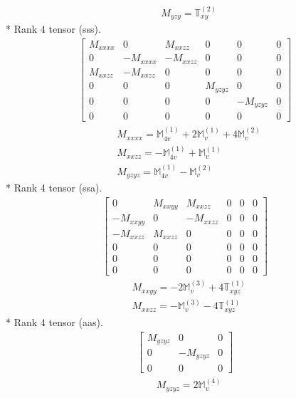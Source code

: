 \documentclass[fleqn,8pt,landscape]{jsarticle}
\begin{document}
\begin{align*}
& M_{yzy} = \mathbb{T}_{xy}^{(2)}
\end{align*}
* Rank 4 tensor (sss).
\begin{align*}
\begin{bmatrix} M_{xxxx} & 0 & M_{xxzz} & 0 & 0 & 0 \\ 0 & - M_{xxxx} & - M_{xxzz} & 0 & 0 & 0 \\ M_{xxzz} & - M_{xxzz} & 0 & 0 & 0 & 0 \\ 0 & 0 & 0 & M_{yzyz} & 0 & 0 \\ 0 & 0 & 0 & 0 & - M_{yzyz} & 0 \\ 0 & 0 & 0 & 0 & 0 & 0 \end{bmatrix}
\end{align*}
\begin{align*}
& M_{xxxx} = \mathbb{M}_{4v}^{(1)} + 2 \mathbb{M}_{v}^{(1)} + 4 \mathbb{M}_{v}^{(2)} \\
& M_{xxzz} = - \mathbb{M}_{4v}^{(1)} + \mathbb{M}_{v}^{(1)} \\
& M_{yzyz} = \mathbb{M}_{4v}^{(1)} - \mathbb{M}_{v}^{(2)}
\end{align*}
* Rank 4 tensor (ssa).
\begin{align*}
\begin{bmatrix} 0 & M_{xxyy} & M_{xxzz} & 0 & 0 & 0 \\ - M_{xxyy} & 0 & - M_{xxzz} & 0 & 0 & 0 \\ - M_{xxzz} & M_{xxzz} & 0 & 0 & 0 & 0 \\ 0 & 0 & 0 & 0 & 0 & 0 \\ 0 & 0 & 0 & 0 & 0 & 0 \\ 0 & 0 & 0 & 0 & 0 & 0 \end{bmatrix}
\end{align*}
\begin{align*}
& M_{xxyy} = - 2 \mathbb{M}_{v}^{(3)} + 4 \mathbb{T}_{xyz}^{(1)} \\
& M_{xxzz} = - \mathbb{M}_{v}^{(3)} - 4 \mathbb{T}_{xyz}^{(1)}
\end{align*}
* Rank 4 tensor (aas).
\begin{align*}
\begin{bmatrix} M_{yzyz} & 0 & 0 \\ 0 & - M_{yzyz} & 0 \\ 0 & 0 & 0 \end{bmatrix}
\end{align*}
\begin{align*}
& M_{yzyz} = 2 \mathbb{M}_{v}^{(4)}
\end{align*}
\end{document}
